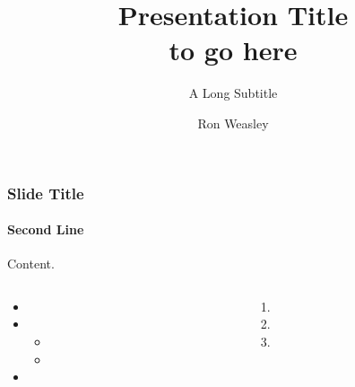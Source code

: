 \documentclass[
aspectratio=169,
]{beamer}
\title{Presentation Title\\to go here}
\subtitle{A Long Subtitle}
\author{Ron Weasley}
\institute[Computer Science]{Liverpool}
\begin{document}
%
%

\begin{frame}[uolcolours=Teal Green]
\maketitle
\end{frame}


\newcommand{\democontent}{
    Content.
    \lipsum[1][1-2]

    \begin{columns}[T]
        \begin{column}{0.5\textwidth}
            \begin{itemize}
                \item \lipsum[1][2]
                \item \lipsum[2][2]
                    \begin{itemize}
                        \item \lipsum[3][1]
                        \item \lipsum[4][2]
                    \end{itemize}
                \item \lipsum[5][2]
            \end{itemize}
        \end{column}

        \begin{column}{0.5\textwidth}
            \begin{enumerate}
                \item \lipsum[3][1]
                \item \lipsum[4][2]
                \item \lipsum[5][2]
            \end{enumerate}
        \end{column}
    \end{columns}
}

\begin{frame}[t]
    \frametitle{Slide Title}
    \framesubtitle{Second Line}

\democontent 
\end{frame}
\end{document}

